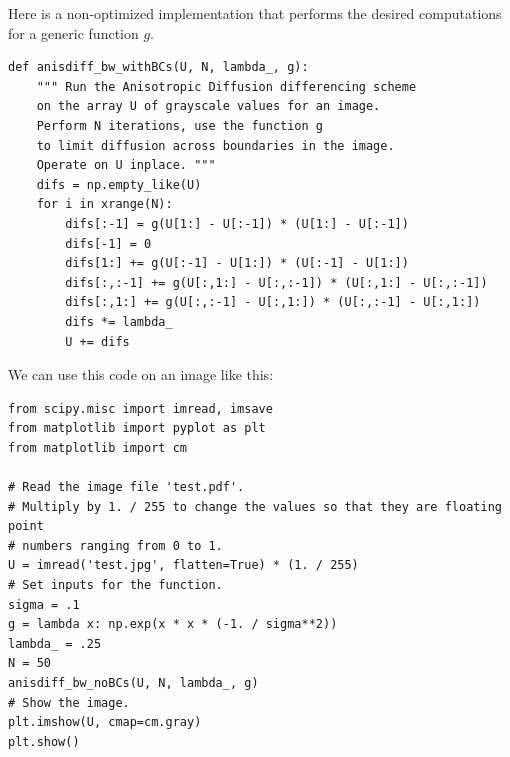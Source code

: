 Here is a non-optimized implementation that performs the desired computations for a generic function $g$.
\begin{lstlisting}
def anisdiff_bw_withBCs(U, N, lambda_, g):
    """ Run the Anisotropic Diffusion differencing scheme
    on the array U of grayscale values for an image.
    Perform N iterations, use the function g
    to limit diffusion across boundaries in the image.
    Operate on U inplace. """
    difs = np.empty_like(U)
    for i in xrange(N):
        difs[:-1] = g(U[1:] - U[:-1]) * (U[1:] - U[:-1])
        difs[-1] = 0
        difs[1:] += g(U[:-1] - U[1:]) * (U[:-1] - U[1:])
        difs[:,:-1] += g(U[:,1:] - U[:,:-1]) * (U[:,1:] - U[:,:-1])
        difs[:,1:] += g(U[:,:-1] - U[:,1:]) * (U[:,:-1] - U[:,1:])
        difs *= lambda_
        U += difs
\end{lstlisting}

We can use this code on an image like this:
\begin{lstlisting}
from scipy.misc import imread, imsave
from matplotlib import pyplot as plt
from matplotlib import cm

# Read the image file 'test.pdf'.
# Multiply by 1. / 255 to change the values so that they are floating point
# numbers ranging from 0 to 1.
U = imread('test.jpg', flatten=True) * (1. / 255)
# Set inputs for the function.
sigma = .1
g = lambda x: np.exp(x * x * (-1. / sigma**2))
lambda_ = .25
N = 50
anisdiff_bw_noBCs(U, N, lambda_, g)
# Show the image.
plt.imshow(U, cmap=cm.gray)
plt.show()
\end{lstlisting}

